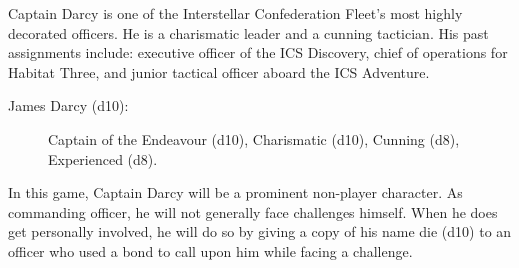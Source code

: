 \documentclass[11pt, a5paper, parskip=half-, DIV=12]{scrartcl}
\begin{document}
Captain Darcy is one of the Interstellar Confederation Fleet's most highly decorated officers. He is a charismatic leader and a cunning tactician. His past assignments include: executive officer of the ICS Discovery, chief of operations for Habitat Three, and junior tactical officer aboard the ICS Adventure.

\begin{description}
	\item[James Darcy (d10):] Captain of the Endeavour (d10), Charismatic (d10), Cunning (d8), Experienced (d8).
\end{description}

In this game, Captain Darcy will be a prominent non-player character. As commanding officer, he will not generally face challenges himself. When he does get personally involved, he will do so by giving a copy of his name die (d10) to an officer who used a bond to call upon him while facing a challenge.

\newpage

\ClearShipoutPicture
\end{document}

